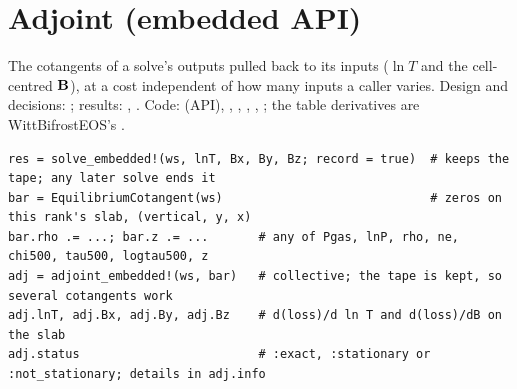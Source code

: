 \section{Adjoint (embedded API)}\label{sec:adjointapi}
The cotangents of a solve's outputs pulled back to its inputs ($\ln T$ and the cell-centred $\mathbf B$), at a cost independent of
how many inputs a caller varies. Design and decisions: ; results: ,
. Code:  (API), , ,
, , ; the table derivatives are WittBifrostEOS's .
{\footnotesize\begin{verbatim}
res = solve_embedded!(ws, lnT, Bx, By, Bz; record = true)  # keeps the tape; any later solve ends it
bar = EquilibriumCotangent(ws)                             # zeros on this rank's slab, (vertical, y, x)
bar.rho .= ...; bar.z .= ...       # any of Pgas, lnP, rho, ne, chi500, tau500, logtau500, z
adj = adjoint_embedded!(ws, bar)   # collective; the tape is kept, so several cotangents work
adj.lnT, adj.Bx, adj.By, adj.Bz    # d(loss)/d ln T and d(loss)/dB on the slab
adj.status                         # :exact, :stationary or :not_stationary; details in adj.info
\end{verbatim}}
